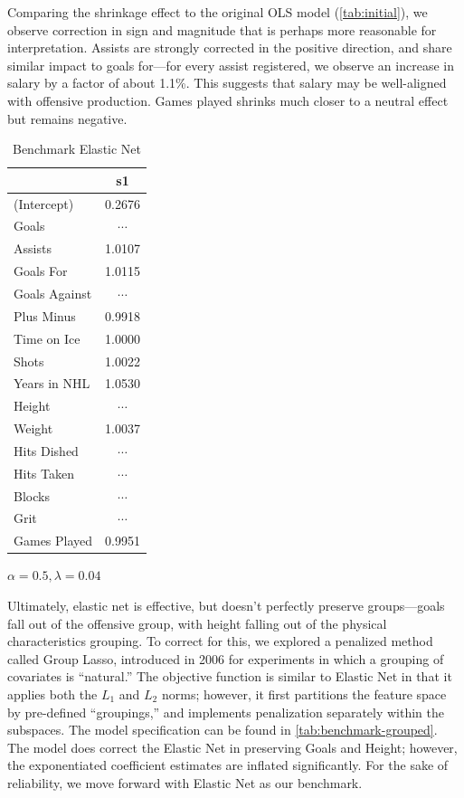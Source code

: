 \documentclass[10pt]{article}
\begin{document}
Comparing the shrinkage effect to the original OLS model (\autoref{tab:initial}), we observe correction in sign and magnitude that is perhaps more reasonable for interpretation. Assists are strongly corrected in the positive direction, and share similar impact to goals for—for every assist registered, we observe an increase in salary by a factor of about 1.1\%. This suggests that salary may be well-aligned with offensive production. Games played shrinks much closer to a neutral effect but remains negative. 

\begin{table}[ht]
\caption{\label{tab:benchmark}Benchmark Elastic Net}
\centering
\begin{threeparttable}
\begin{tabular}[t]{lc}
\toprule
 & s1 \\ 
  \midrule
(Intercept) & 0.2676 \\ 
  Goals & $\cdots$ \\ 
  Assists & 1.0107 \\ 
  Goals For & 1.0115  \\ 
  Goals Against & $\cdots$  \\ 
  Plus Minus & 0.9918 \\ 
  Time on Ice & 1.0000  \\ 
  Shots & 1.0022  \\ 
  Years in NHL & 1.0530 \\ 
  Height & $\cdots$ \\ 
  Weight & 1.0037 \\ 
  Hits Dished &  $\cdots$ \\ 
  Hits Taken &  $\cdots$ \\ 
  Blocks &  $\cdots$   \\ 
  Grit &  $\cdots$  \\ 
  Games Played & 0.9951 \\ 
\bottomrule
\end{tabular}
    \begin{tablenotes}
      \item $\alpha = 0.5, \lambda = 0.04$
    \end{tablenotes}
  \end{threeparttable}    
\end{table}

Ultimately, elastic net is effective, but doesn’t perfectly preserve groups—goals fall out of the offensive group, with height falling out of the physical characteristics grouping. To correct for this, we explored a penalized method called Group Lasso, introduced in 2006 for experiments in which a grouping of covariates is “natural.” The objective function is similar to Elastic Net in that it applies both the $L_1$ and $L_2$ norms; however, it first partitions the feature space by pre-defined “groupings,” and implements penalization separately within the subspaces. The model specification can be found in \autoref{tab:benchmark-grouped}. The model does correct the Elastic Net in preserving Goals and Height; however, the exponentiated coefficient estimates are inflated significantly. For the sake of reliability, we move forward with Elastic Net as our benchmark.  
\end{document}

